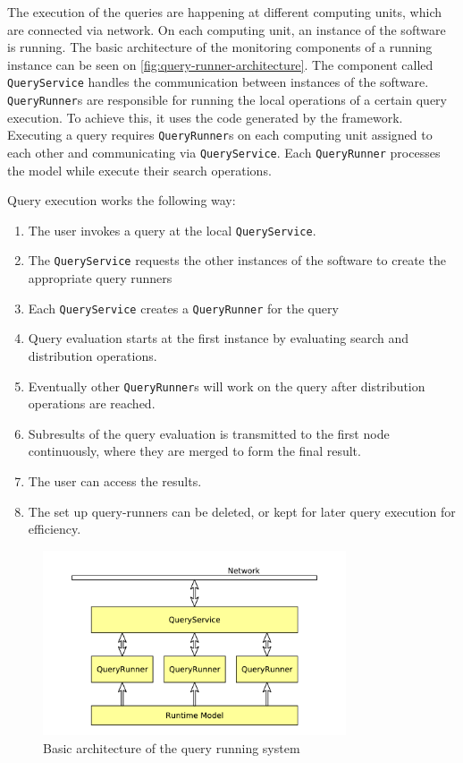 The execution of the queries are happening at different computing units, which are connected via network.
On each computing unit, an instance of the software is running.
The basic architecture of the monitoring components of a running instance can be seen on \autoref{fig:query-runner-architecture}.
The component called \texttt{QueryService} handles the communication between instances of the software.
\texttt{QueryRunner}s are responsible for running the local operations of a certain query execution. 
To achieve this, it uses the code generated by the framework.
Executing a query requires \texttt{QueryRunner}s on each computing unit assigned to each other and communicating via \texttt{QueryService}. 
Each \texttt{QueryRunner} processes the model while execute their search operations.

Query execution works the following way:
\begin{enumerate}
\item The user invokes a query at the local \texttt{QueryService}.
\item The \texttt{QueryService} requests the other instances of the software to create the appropriate query runners
\item Each \texttt{QueryService} creates a \texttt{QueryRunner} for the query
\item Query evaluation starts at the first instance by evaluating search and distribution operations.
\item Eventually other \texttt{QueryRunner}s will work on the query after distribution operations are reached.
\item Subresults of the query evaluation is transmitted to the first node continuously, where they are merged to form the final result.
\item The user can access the results.
\item The set up query-runners can be deleted, or kept for later query execution for efficiency.
\end{enumerate}


\begin{figure}[H]
	\begin{center}
		\includegraphics[width=0.8\textwidth]{figures/query-runner-architecture.pdf}
		\caption{ Basic architecture of the query running system }
		\label{fig:query-runner-architecture}
	\end{center}
\end{figure}









